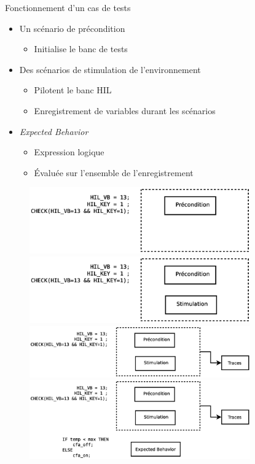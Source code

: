 \begin{frame}{Fonctionnement d'un cas de tests}
	\begin{itemize}[<+->]
	  \vfill
		\item Un scénario de précondition
		\begin{itemize}
			\item Initialise le banc de tests
		\end{itemize}
	\vfill
		\item Des scénarios de stimulation de l'environnement
			\begin{itemize}
			\item Pilotent le banc HIL 
			\item Enregistrement de variables durant les scénarios
			\end{itemize}
	\vfill
		\item \textit{Expected Behavior }
			\begin{itemize}
				\item Expression logique 
				\item Évaluée sur l'ensemble de l'enregistrement
			\end{itemize}
			\vspace{-30px}
	\end{itemize}
	\begin{figure}[H]
		\centering
		 {
			\includegraphics[width=9.5cm]{images/exe1.eps}
		}
		\only<3,4> {
			\includegraphics[width=9.5cm]{images/exe2.eps}
		}
		\only<5> {
			\includegraphics[width=9.5cm]{images/exe3.eps}
		}
		\only<6,7> {
			\includegraphics[width=9.5cm]{images/exe4.eps}
}
\end{figure}
\end{frame}
